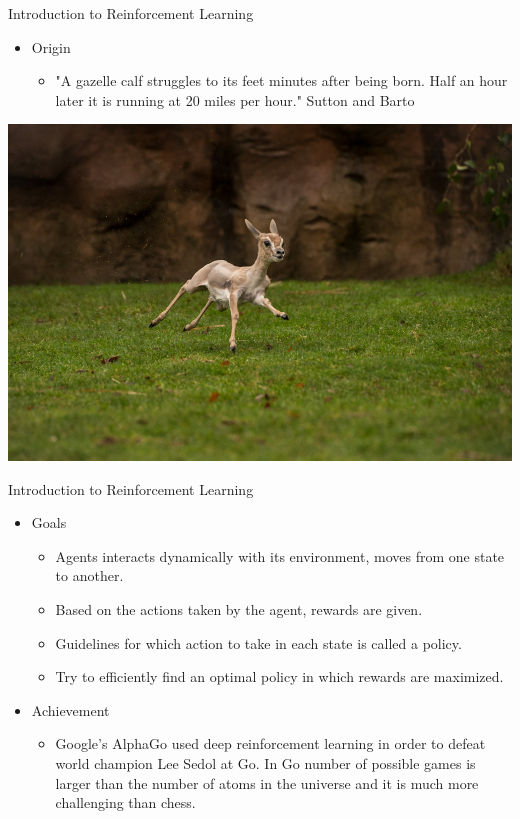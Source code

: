 \documentclass{beamer}
\begin{document}
\begin{frame}[t]{Introduction to Reinforcement Learning} %
\begin{itemize}
\item Origin
	\begin{itemize}
	\item "A gazelle calf struggles to its feet minutes after being born. Half an hour later it is running at 20 miles per hour." Sutton and Barto
	\end{itemize}
\end{itemize}
\begin{center}
\includegraphics[scale=0.20]{baby}
\end{center}
\end{frame}


\begin{frame}[t]{Introduction to Reinforcement Learning} %
\begin{itemize}
\item Goals
	\begin{itemize}
	\item Agents interacts dynamically with its environment, moves from one state to another.
	\item Based on the actions taken by the agent, rewards are given.
	\item Guidelines for which action to take in each state is called a policy.
	\item Try to efficiently find an optimal policy in which rewards are maximized.
	\end{itemize}
\item Achievement
	\begin{itemize}
	\item Google's AlphaGo used deep reinforcement learning in order to defeat world champion Lee Sedol at Go. In Go number of possible games is larger than the number of atoms in the universe and it is much more challenging than chess.
	\end{itemize}
\end{itemize}
\end{frame}
\end{document}
